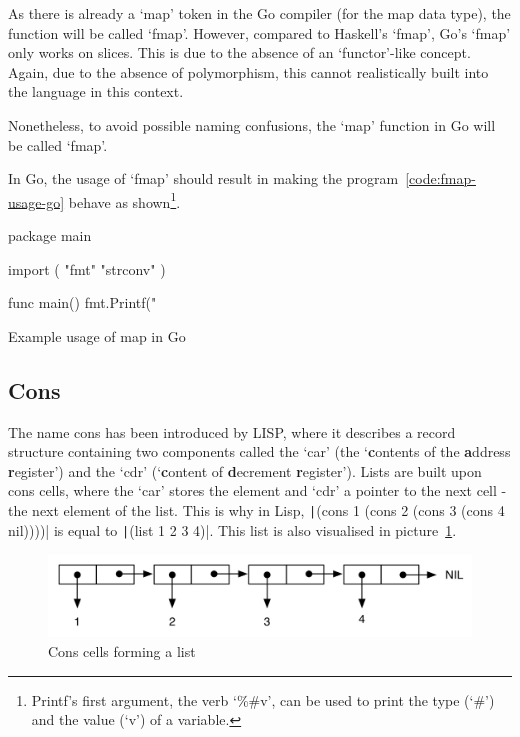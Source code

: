 As there is already a `map' token in the Go compiler (for the map data type),
the function will be called `fmap'. However, compared to Haskell's `fmap',
Go's `fmap' only works on slices. This is due
to the absence of an `functor'-like concept. Again, due to the absence of polymorphism,
this cannot realistically built into the language in this context.

Nonetheless, to avoid possible naming confusions, the `map' function in Go will
be called `fmap'.

In Go, the usage of `fmap' should result in making the program~\ref{code:fmap-usage-go}
behave as shown\footnote{Printf's first argument, the
verb `\%\#v', can be used to print the type (`\#') and the value (`v') of a
variable\autocite{fmt-godoc}.}.

\begin{listing}
\begin{gocode}
package main

import (
  "fmt"
  "strconv"
)

func main() {
  fmt.Printf("%
}
\end{gocode}
\caption{Example usage of map in Go}\label{code:fmap-usage-go}
\end{listing}
\subsection{Cons}

The name cons has been introduced by LISP, where it describes a record structure
containing two components called the `car' (the `\textbf{c}ontents of the \textbf{a}ddress \textbf{r}egister')
and the `cdr' (`\textbf{c}ontent of \textbf{d}ecrement \textbf{r}egister').
Lists are built upon cons cells, where the `car' stores the element and `cdr' a
pointer to the next cell - the next element of the list.
This is why in Lisp, \texttt|(cons 1 (cons 2 (cons 3 (cons 4 nil))))| is equal to
\texttt|(list 1 2 3 4)|. This list is also visualised in picture~\ref{fig:cons}.

\begin{figure}[h!]
  \includegraphics[width=\linewidth]{../img/cons.png}
  \caption{Cons cells forming a list\autocite{cons-image-source}}
  \label{fig:cons}
\end{figure}

